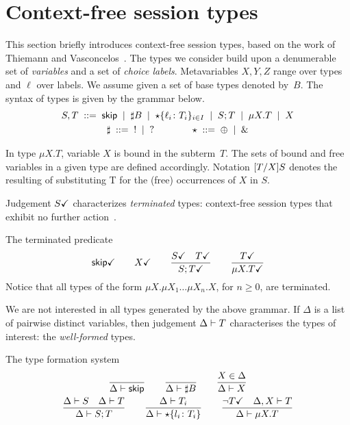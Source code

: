 \section{Context-free session types}
\label{sec:contextfreesession}

This section briefly introduces context-free session types, based on
the work of Thiemann and Vasconcelos~\cite{thiemann2016context}.
%
The types we consider build upon a denumerable set of \emph{variables}
and a set of \emph{choice labels}.  Metavariables $X,Y,Z$ range over
types and $\ell$ over labels.
%
We assume given a set of base types denoted by~$B$.
The syntax of types is given by the grammar below.
%
\begin{gather*}
  S,T \grmeq \skipk \grmor \sharp B \grmor 
  \star\{\ell_i\colon T_i\}_{i\in I} \grmor S;T \grmor \mu X.T \grmor X
  \\
  \sharp \grmeq {}! \grmor {}? 
  \qquad \qquad
  \star  \grmeq \oplus \grmor {}\&
\end{gather*}

In type $\mu X.T$, variable $X$ is bound in the subterm~$T$. The sets
of bound and free variables in a given type are defined
accordingly. Notation $\subs{T}{X}S$ denotes the resulting of
substituting T for the (free) occurrences of $X$ in $S$.

Judgement $\DONE S$ characterizes \emph{terminated} types:
context-free session types that exhibit no further
action~\cite{DBLP:journals/jacm/AcetoH92}.

\noindent The terminated predicate\hfill{} 
%
\begin{gather*}
  \DONE{\skipk}
  \qquad 
  \DONE X
  \qquad
  \frac{\DONE{S} \quad \DONE{T}}{\DONE{S; T}}
  \qquad
  \frac{\DONE T}{\DONE{\mu X.T}}
\end{gather*}
%
Notice that all types of the form $\mu X. \mu X_1\dots\mu X_n.X$, for
$n\ge0$, are terminated.

We are not interested in all types generated by the above grammar.
%
If $\Delta$ is a list of pairwise distinct variables, then judgement
$\isType T$ characterises the types of interest: the
\emph{well-formed} types.

\noindent The type formation system \hfill{}
%
\begin{gather*}
  \frac{} 
  {
    \isType \skipk
  }
  \qquad
  \frac{}
  {
    \isType {\sharp B}
  }
  \qquad
  \frac{
    X \in \Delta
  }{
    \isType{X}
  }
  \\
  \frac{
    \isType{S}
    \quad
    \isType{T}
  }{
    \isType{S;T}
  }
  \qquad
  \frac{
    \isType{T_i}
  }{
    \isType{\star 
      \{ l_i \colon T_i\}}
  }
  \qquad
  \frac{
    \neg\DONE T
    \quad 
    \isType [\Delta, X] T
  }{
    \isType {\mu X. T}
  }
\end{gather*}

